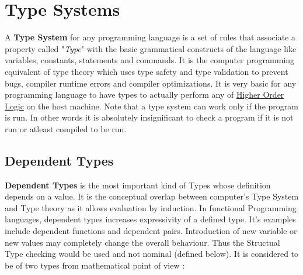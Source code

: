 \chapter{Type Systems}

A \textbf{Type System}\cite{typesystems} for any programming language is a set of rules that associate a property called "\textit{Type}" with the basic grammatical constructs of the language like variables, constants, statements and commands. It is the computer programming equivalent of type theory which uses type safety and type validation to prevent bugs, compiler runtime errors and compiler optimizations. It is very basic for any programming language to have types to actually perform any of \underline{Higher Order Logic} on the host machine. Note that a type system can work only if the program is run. In other words it is absolutely insignificant to check a program if it is not run or atleast compiled to be run.\\


\section{Dependent Types }
\textbf{Dependent Types} \cite{dependent_types} is the most important kind of Types whose definition depends on a value. It is the conceptual overlap between computer's Type System and Type theory as it allows evaluation by induction. In functional Programming languages, dependent types increases expressivity of a defined type. It's examples include dependent functions and dependent pairs. Introduction of new variable or new values may completely change the overall behaviour. Thus the Structual Type checking would be used and not nominal (defined below). It is considered to be of two types from mathematical point of view : \\

